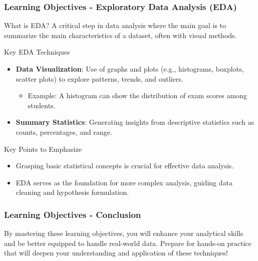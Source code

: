 \documentclass[aspectratio=169]{beamer}
\begin{document}
\begin{frame}[fragile]
    \frametitle{Learning Objectives - Exploratory Data Analysis (EDA)}
    \begin{block}{What is EDA?}
        A critical step in data analysis where the main goal is to summarize the main characteristics of a dataset, often with visual methods.
    \end{block}
    
    \begin{block}{Key EDA Techniques}
        \begin{itemize}
            \item \textbf{Data Visualization}: Use of graphs and plots (e.g., histograms, boxplots, scatter plots) to explore patterns, trends, and outliers.
                \begin{itemize}
                    \item Example: A histogram can show the distribution of exam scores among students.
                \end{itemize}
            \item \textbf{Summary Statistics}: Generating insights from descriptive statistics such as counts, percentages, and range.
        \end{itemize}
    \end{block}
    
    \begin{block}{Key Points to Emphasize}
        \begin{itemize}
            \item Grasping basic statistical concepts is crucial for effective data analysis.
            \item EDA serves as the foundation for more complex analysis, guiding data cleaning and hypothesis formulation.
        \end{itemize}
    \end{block}
\end{frame}

\begin{frame}[fragile]
    \frametitle{Learning Objectives - Conclusion}
    By mastering these learning objectives, you will enhance your analytical skills and be better equipped to handle real-world data. Prepare for hands-on practice that will deepen your understanding and application of these techniques!
\end{frame}
\end{document}
